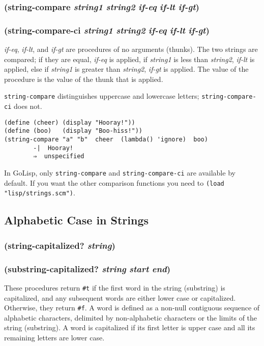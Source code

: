 \documentclass{article}
\begin{document}
\subsubsection{(string-compare \emph{string1} \emph{string2} \emph{if-eq} \emph{if-lt} \emph{if-gt})}

\subsubsection{(string-compare-ci \emph{string1} \emph{string2} \emph{if-eq} \emph{if-lt} \emph{if-gt})}

\emph{if-eq}, \emph{if-lt}, and \emph{if-gt} are procedures of no arguments (thunks). The two
strings are compared; if they are equal, \emph{if-eq} is applied, if \emph{string1} is less
than \emph{string2}, \emph{if-lt} is applied, else if \emph{string1} is greater than
\emph{string2}, \emph{if-gt} is applied. The value of the procedure is the value of the thunk
that is applied.

\verb|string-compare| distinguishes uppercase and lowercase letters;
\verb|string-compare-ci| does not.

\begin{verbatim}
(define (cheer) (display "Hooray!"))
(define (boo)   (display "Boo-hiss!"))
(string-compare "a" "b"  cheer  (lambda() 'ignore)  boo)
        -|  Hooray!
        ⇒  unspecified
\end{verbatim}

In GoLisp, only \verb|string-compare| and \verb|string-compare-ci| are available by default.
If you want the other comparison functions you need to \verb|(load "lisp/strings.scm")|.

\subsection{Alphabetic Case in Strings}\label{sec:alphabetic-case-in-strings}

\subsubsection{(string-capitalized? \emph{string})}

\subsubsection{(substring-capitalized? \emph{string} \emph{start} \emph{end})}

These procedures return \verb|#t| if the first word in the string (substring) is
capitalized, and any subsequent words are either lower case or capitalized. Otherwise, they
return \verb|#f|. A word is defined as a non-null contiguous sequence of alphabetic
characters, delimited by non-alphabetic characters or the limits of the string (substring). A
word is capitalized if its first letter is upper case and all its remaining letters are lower
case.
\end{document}
